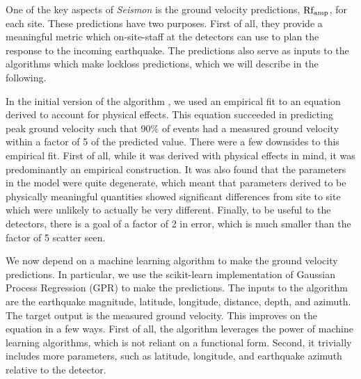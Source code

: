 \documentclass[preprint, aps, showpacs]{revtex4-1}
\begin{document}
One of the key aspects of \emph{Seismon} is the ground velocity predictions, $\rm Rf_{amp}$, for each site. These predictions have two purposes. 
First of all, they provide a meaningful metric which on-site-staff at the detectors can use to plan the response to the incoming earthquake. 
The predictions also serve as inputs to the algorithms which make lockloss predictions, which we will describe in the following.

In the initial version of the algorithm \cite{CoEa2017}, we used an empirical fit to an equation derived to account for physical effects. This equation succeeded in predicting peak ground velocity such that 90\% of events had a measured ground velocity within a factor of 5 of the predicted value.
There were a few downsides to this empirical fit.
First of all, while it was derived with physical effects in mind, it was predominantly an empirical construction.
It was also found that the parameters in the model were quite degenerate, which meant that parameters derived to be physically meaningful quantities showed significant differences from site to site which were unlikely to actually be very different.
Finally, to be useful to the detectors, there is a goal of a factor of 2 in error, which is much smaller than the factor of 5 scatter seen.

We now depend on a machine learning algorithm to make the ground velocity predictions. In particular, we use the scikit-learn implementation of Gaussian Process Regression (GPR) to make the predictions.
The inputs to the algorithm are the earthquake magnitude, latitude, longitude, distance, depth, and azimuth. 
The target output is the measured ground velocity.
This improves on the equation in a few ways.
First of all, the algorithm leverages the power of machine learning algorithms, which is not reliant on a functional form.
Second, it trivially includes more parameters, such as latitude, longitude, and earthquake azimuth relative to the detector.
\end{document}
